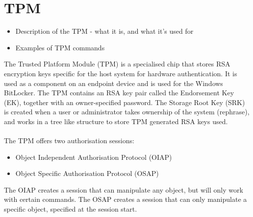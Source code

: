 \section{TPM}
\begin{itemize}
  \item Description of the TPM - what it is, and what it's used for
  \item Examples of TPM commands
\end{itemize}

The Trusted Platform Module (TPM) is a specialised chip that stores RSA encryption keys specific for the host system for hardware authentication. It is used as a component on an endpoint device and is used for the Windows BitLocker.
The TPM contains an RSA key pair called the Endorsement Key (EK), together with an owner-specified password. The Storage Root Key (SRK) is created when a user or administrator takes ownership of the system (rephrase), and works in a tree like structure to store TPM generated RSA keys used. \\ \\
The TPM offers two authorisation sessions:
\begin{itemize}
  \item Object Independent Authorisation Protocol (OIAP)
  \item Object Specific Authorisation Protocol (OSAP)
\end{itemize}
The OIAP creates a session that can manipulate any object, but will only work with certain commands. The OSAP creates a session that can only manipulate a specific object, specified at the session start.